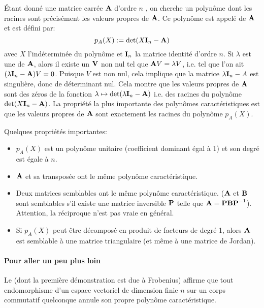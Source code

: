 \medskip
Étant donné une matrice carrée $\MM{A}$ d'ordre $n$ , 
on cherche un polynôme dont les racines sont précisément les valeurs propres de $\MM{A}$.
Ce polynôme est appelé  
de $\MM{A}$ et est défini par:
\begin{equation} p_A(X):=\det(X\MM{I}_n-\MM{A})\end{equation}
avec $X$ l'indéterminée du polynôme et $\MM{I}_n$ la matrice identité d'ordre $n$.
\medskipvm
Si $\lambda$ est une  de $\MM{A}$, alors il existe un 
 $\VV{V}$ non nul tel que $\MM{A}V = \lambda V$, i.e. 
tel que l'on ait $(\lambda \MM{I}_n-\MM{A})V = 0$.
\medskipvm
Puisque $V$ est non nul, cela implique que la matrice $\lambda \MM{I}_n-A$ est singulière, donc de déterminant nul. 
\medskipvm
Cela montre que les valeurs propres de $\MM{A}$ sont des zéros de la fonction $\lambda\mapsto \det(\lambda \MM{I}_n - \MM{A})$
i.e. des racines du polynôme $\det(X\MM{I}_n-\MM{A})$.
\medskipvm
La propriété la plus importante des polynômes caractéristiques est que 
les valeurs propres de $\MM{A}$ sont exactement les racines du polynôme $p_A(X)$. 

\medskip
Quelques propriétés importantes:
\begin{itemize}
   \item $p_A(X)$ est un polynôme unitaire (coefficient dominant égal à 1) et son degré 
	est égale à $n$.
   \item $\MM{A}$ et sa transposée ont le même polynôme caractéristique.
   \item Deux matrices semblables ont le même polynôme caractéristique. ($\MM{A}$ et $\MM{B}$ sont semblables s'il 
	existe une matrice inversible $\MM{P}$ telle que $\MM{A} = \MM{PBP}^{-1}$).
	Attention, la réciproque n'est pas vraie en général.
   \item Si $p_A(X)$ peut être décomposé en produit de facteurs de degré 1, alors $\MM{A}$ est semblable
	à une matrice triangulaire (et même à une matrice de Jordan).
\end{itemize}

\medskip
{}
\paragraph{Pour aller un peu plus loin}
Le  
(dont la première démonstration est due à Frobenius)
affirme que tout endomorphisme d'un espace vectoriel de dimension finie $n$ sur un corps commutatif quelconque 
annule son propre polynôme caractéristique.

